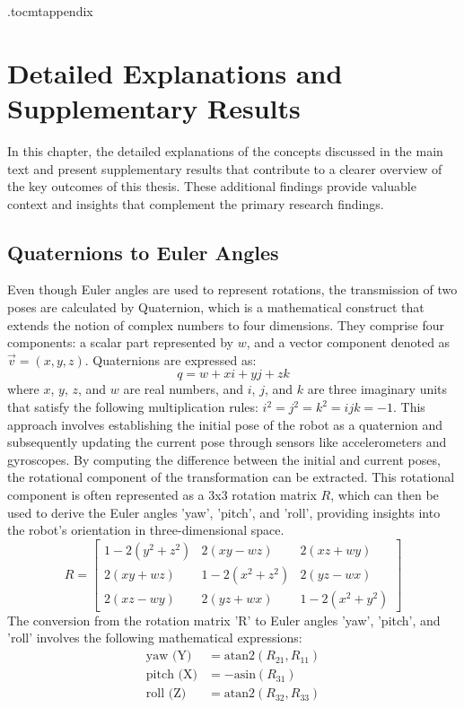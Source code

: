 \newpage
\appendix
\newpage


\captionsetup[figure]{font=small,skip=0pt}
\etocdepthtag.toc{mtappendix}
\tableofcontents
\pagestyle{plain}

\newpage
{}
\chapter{Detailed Explanations and Supplementary Results}
In this chapter, the detailed explanations of the concepts discussed in the main text and present supplementary results that contribute to a clearer overview of the key outcomes of this thesis. These additional findings provide valuable context and insights that complement the primary research findings.

\section{Quaternions to Euler Angles}
\label{sec:Q2E}
Even though Euler angles are used to represent rotations, the transmission of two poses are calculated by Quaternion, which is a mathematical construct that extends the notion of complex numbers to four dimensions. They comprise four components: a scalar part represented by $w$, and a vector component denoted as $\vec{v}=(x, y, z)$. Quaternions are expressed as:
$$q = w + xi + yj + zk$$
where $x$, $y$, $z$, and $w$ are real numbers, and $i$, $j$, and $k$ are three imaginary units that satisfy the following multiplication rules: $i^2 = j^2 = k^2 = ijk = -1$. This approach involves establishing the initial pose of the robot as a quaternion and subsequently updating the current pose through sensors like accelerometers and gyroscopes. By computing the difference between the initial and current poses, the rotational component of the transformation can be extracted. This rotational component is often represented as a 3x3 rotation matrix $R$, which can then be used to derive the Euler angles 'yaw', 'pitch', and 'roll', providing insights into the robot's orientation in three-dimensional space. 
$$ R = \begin{bmatrix}
1 - 2(y^2 + z^2) & 2(xy - wz) & 2(xz + wy) \\
2(xy + wz) & 1 - 2(x^2 + z^2) & 2(yz - wx) \\
2(xz - wy) & 2(yz + wx) & 1 - 2(x^2 + y^2)
\end{bmatrix}
$$
The conversion from the rotation matrix 'R' to Euler angles 'yaw', 'pitch', and 'roll' involves the following mathematical expressions:
\begin{align*}
\text{yaw (Y)} & = \text{atan2}(R_{21}, R_{11}) \\
\text{pitch (X)} & = -\text{asin}(R_{31}) \\
\text{roll (Z)} & = \text{atan2}(R_{32}, R_{33})
\end{align*}


